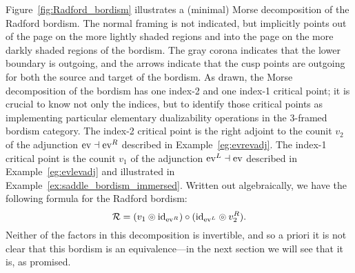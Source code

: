 \documentclass{amsart}
\begin{document}
Figure~\ref{fig:Radford_bordism} illustrates a (minimal) Morse decomposition of the Radford bordism.  The normal framing is not indicated, but implicitly points out of the page on the more lightly shaded regions and into the page on the more darkly shaded regions of the bordism.  The gray corona indicates that the lower boundary is outgoing, and the arrows indicate that the cusp points are outgoing for both the source and target of the bordism.  As drawn, the Morse decomposition of the bordism has one index-2 and one index-1 critical point; it is crucial to know not only the indices, but to identify those critical points as implementing particular elementary dualizability operations in the 3-framed bordism category.  The index-2 critical point is the right adjoint to the counit $v_2$ of the adjunction $\mathrm{ev} \dashv \mathrm{ev}^R$ described in Example~\ref{eg:evrevadj}.  The index-1 critical point is the counit $v_1$ of the adjunction $\mathrm{ev}^L \dashv \mathrm{ev}$ described in Example~\ref{eg:evlevadj} and illustrated in Example~\ref{ex:saddle_bordism_immersed}.  Written out algebraically, we have the following formula for the Radford bordism:
\begin{equation*}
	\mathcal R = (v_1 \circledcirc \mathrm{id}_{\mathrm{ev}^R})\circ (\mathrm{id}_{\mathrm{ev}^L} \circledcirc v_2^R).
\end{equation*}
Neither of the factors in this decomposition is invertible, and so a priori it is not clear that this bordism is an equivalence---in the next section we will see that it is, as promised.
\end{document}
